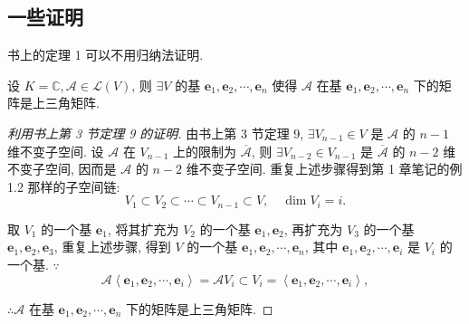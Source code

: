 \documentclass{ctexart}
\begin{document}
\subsection{一些证明}
书上的定理 1 可以不用归纳法证明.
\begin{theorem}
    设 $K=\mathbb{C},\mathcal{A}\in\mathcal{L}(V)$, 则 $\exists V$ 的基 $\boldsymbol{e}_1,\boldsymbol{e}_2,\cdots,\boldsymbol{e}_n$ 使得 $\mathcal{A}$ 在基 $\boldsymbol{e}_1,\boldsymbol{e}_2,\cdots,\boldsymbol{e}_n$ 下的矩阵是上三角矩阵.
\end{theorem}
\begin{proof}[利用书上第 3 节定理 9 的证明]
    由书上第 3 节定理 9, $\exists V_{n-1}\in V$ 是 $\mathcal{A}$ 的 $n-1$ 维不变子空间. 设 $\mathcal{A}$ 在 $V_{n-1}$ 上的限制为 $\overline{\mathcal{A}}$, 则 $\exists V_{n-2}\in V_{n-1}$ 是 $\overline{\mathcal{A}}$ 的 $n-2$ 维不变子空间, 因而是 $\mathcal{A}$ 的 $n-2$ 维不变子空间. 重复上述步骤得到第 1 章笔记的例 1.2 那样的子空间链:
    \[V_1\subset V_2\subset\cdots\subset V_{n-1}\subset V,\quad\dim V_i=i.\]

    取 $V_1$ 的一个基 $\boldsymbol{e}_1$, 将其扩充为 $V_2$ 的一个基 $\boldsymbol{e}_1,\boldsymbol{e}_2$, 再扩充为 $V_3$ 的一个基 $\boldsymbol{e}_1,\boldsymbol{e}_2,\boldsymbol{e}_3$, 重复上述步骤, 得到 $V$ 的一个基 $\boldsymbol{e}_1,\boldsymbol{e}_2,\cdots,\boldsymbol{e}_n$, 其中 $\boldsymbol{e}_1,\boldsymbol{e}_2,\cdots,\boldsymbol{e}_i$ 是 $V_i$ 的一个基. $\because$
    \[\mathcal{A}\left<\boldsymbol{e}_1,\boldsymbol{e}_2,\cdots,\boldsymbol{e}_i\right>=\mathcal{A}V_i\subset V_i=\left<\boldsymbol{e}_1,\boldsymbol{e}_2,\cdots,\boldsymbol{e}_i\right>,\]

    $\therefore\mathcal{A}$ 在基 $\boldsymbol{e}_1,\boldsymbol{e}_2,\cdots,\boldsymbol{e}_n$ 下的矩阵是上三角矩阵.
\end{proof}
\end{document}
